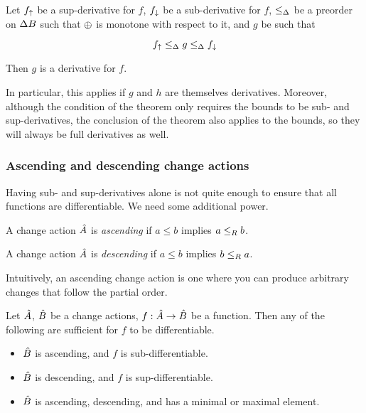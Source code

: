 \begin{thm}
  \label{thm:sandwich}
  Let $f_\uparrow$ be a sup-derivative for $f$, $f_\downarrow$ be a sub-derivative for $f$, $\leq_\Delta$ be a preorder on $\Delta B$ such that $\oplus$ is monotone with
  respect to it, and $g$ be such that

  $$f_\uparrow \leq_\Delta g \leq_\Delta f_\downarrow$$

  Then $g$ is a derivative for $f$.
\end{thm}

In particular, this applies if $g$ and $h$ are themselves derivatives. Moreover,
although the condition of the theorem only requires the bounds to be sub- and
sup-derivatives, the conclusion of the theorem also applies to the bounds, so
they will always be full derivatives as well.

\subsubsection{Ascending and descending change actions}

Having sub- and sup-derivatives alone is not quite enough to ensure that all
functions are differentiable. We need some additional power.

\begin{defn}
  A change action $\hat{A}$ is \textit{ascending} if $a \leq b$ implies $a
  \leq_R b$.

  A change action $\hat{A}$ is \textit{descending} if $a \leq b$ implies $b
  \leq_R a$.
\end{defn}

Intuitively, an ascending change action is one where you can produce
arbitrary changes that follow the partial order.

\begin{thm}
  Let $\hat{A}$, $\hat{B}$ be a change actions, $f: \hat{A} \rightarrow \hat{B}$ be a function. Then
  any of the following are sufficient for $f$ to be differentiable.
  \begin{itemize}
    \item $\hat{B}$ is ascending, and $f$ is sub-differentiable.
    \item $\hat{B}$ is descending, and $f$ is sup-differentiable.
    \item $\hat{B}$ is ascending, descending, and has a minimal or maximal element.
  \end{itemize}
\end{thm}

